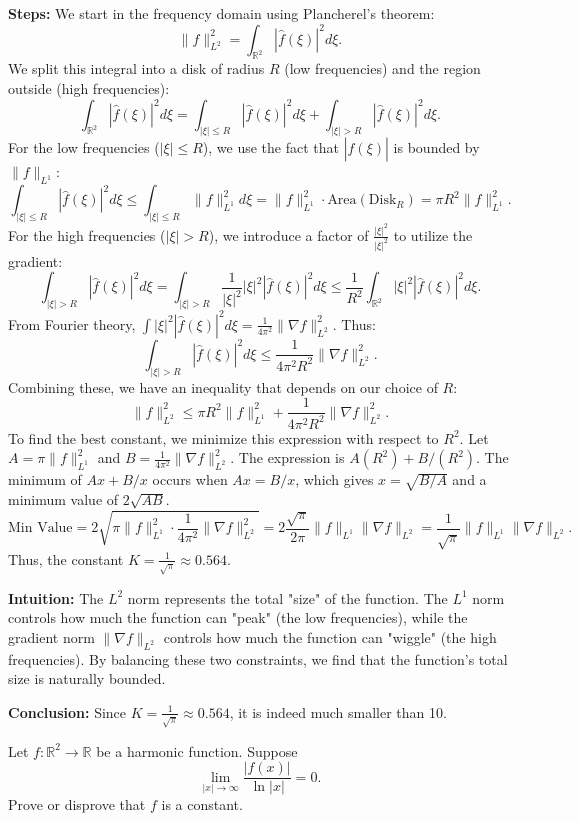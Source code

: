 \begin{solution}
\textbf{Steps:}
We start in the frequency domain using Plancherel's theorem:
\[
\|f\|_{L^2}^2 = \int_{\mathbb{R}^2} |\hat{f}(\xi)|^2 d\xi.
\]
We split this integral into a disk of radius $R$ (low frequencies) and the region outside (high frequencies):
\[
\int_{\mathbb{R}^2} |\hat{f}(\xi)|^2 d\xi = \int_{|\xi| \leq R} |\hat{f}(\xi)|^2 d\xi + \int_{|\xi| > R} |\hat{f}(\xi)|^2 d\xi.
\]
For the low frequencies ($|\xi| \leq R$), we use the fact that $|\hat{f}(\xi)|$ is bounded by $\|f\|_{L^1}$:
\[
\int_{|\xi| \leq R} |\hat{f}(\xi)|^2 d\xi \leq \int_{|\xi| \leq R} \|f\|_{L^1}^2 d\xi = \|f\|_{L^1}^2 \cdot \text{Area}(\text{Disk}_R) = \pi R^2 \|f\|_{L^1}^2.
\]
For the high frequencies ($|\xi| > R$), we introduce a factor of $\frac{|\xi|^2}{|\xi|^2}$ to utilize the gradient:
\[
\int_{|\xi| > R} |\hat{f}(\xi)|^2 d\xi = \int_{|\xi| > R} \frac{1}{|\xi|^2} |\xi|^2 |\hat{f}(\xi)|^2 d\xi \leq \frac{1}{R^2} \int_{\mathbb{R}^2} |\xi|^2 |\hat{f}(\xi)|^2 d\xi.
\]
From Fourier theory, $\int |\xi|^2 |\hat{f}(\xi)|^2 d\xi = \frac{1}{4\pi^2} \|\nabla f\|_{L^2}^2$. Thus:
\[
\int_{|\xi| > R} |\hat{f}(\xi)|^2 d\xi \leq \frac{1}{4\pi^2 R^2} \|\nabla f\|_{L^2}^2.
\]
Combining these, we have an inequality that depends on our choice of $R$:
\[
\|f\|_{L^2}^2 \leq \pi R^2 \|f\|_{L^1}^2 + \frac{1}{4\pi^2 R^2} \|\nabla f\|_{L^2}^2.
\]
To find the best constant, we minimize this expression with respect to $R^2$. Let $A = \pi \|f\|_{L^1}^2$ and $B = \frac{1}{4\pi^2} \|\nabla f\|_{L^2}^2$. The expression is $A(R^2) + B/(R^2)$. The minimum of $Ax + B/x$ occurs when $Ax = B/x$, which gives $x = \sqrt{B/A}$ and a minimum value of $2\sqrt{AB}$.
\[
\text{Min Value} = 2 \sqrt{\pi \|f\|_{L^1}^2 \cdot \frac{1}{4\pi^2} \|\nabla f\|_{L^2}^2} = 2 \frac{\sqrt{\pi}}{2\pi} \|f\|_{L^1} \|\nabla f\|_{L^2} = \frac{1}{\sqrt{\pi}} \|f\|_{L^1} \|\nabla f\|_{L^2}.
\]
Thus, the constant $K = \frac{1}{\sqrt{\pi}} \approx 0.564$.

\textbf{Intuition:}
The $L^2$ norm represents the total "size" of the function. The $L^1$ norm controls how much the function can "peak" (the low frequencies), while the gradient norm $\|\nabla f\|_{L^2}$ controls how much the function can "wiggle" (the high frequencies). By balancing these two constraints, we find that the function's total size is naturally bounded.

\textbf{Conclusion:}
Since $K = \frac{1}{\sqrt{\pi}} \approx 0.564$, it is indeed much smaller than 10.
\end{solution}

\begin{exercise}
\label{analysis:2019:3}
Let $f:\mathbb{R}^2\to\mathbb{R}$ be a harmonic function. Suppose
\[
\lim_{|x|\to\infty}\frac{|f(x)|}{\ln|x|} = 0.
\]
Prove or disprove that $f$ is a constant.
\end{exercise}

